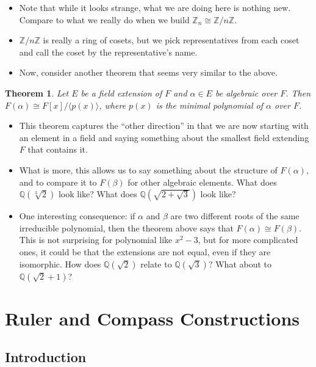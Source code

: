 \documentclass[12pt]{article}
\theoremstyle{plain}
\newtheorem*{theorem}{Theorem}
\theoremstyle{definition}
\theoremstyle{remark}
\newcommand{\ex}{\noindent{\bf Ex: }}
\def\Z{\mathbb Z}
\def\Q{\mathbb Q}
\newcommand{\todayis}[1]{\clearpage{\rhead{\footnotesize #1}}}
\begin{document}
\begin{itemize}
\item Note that while it looks strange, what we are doing here is nothing new.  Compare to what we really do when we build $\Z_n \cong \Z/n\Z$.  
\item $\Z/n\Z$ is really a ring of cosets, but we pick representatives from each coset and call the coset by the representative's name.
\item Now, consider another theorem that seems very similar to the above.
\end{itemize}

\begin{theorem}
  Let $E$ be a field extension of $F$ and $\alpha \in E$ be algebraic over $F$.  Then $F(\alpha) \cong F[x]/\langle p(x) \rangle$, where $p(x)$ is the minimal polynomial of $\alpha$ over $F$.
\end{theorem}

\begin{itemize}
  \item This theorem captures the ``other direction'' in that we are now starting with an element in a field and saying something about the smallest field extending $F$ that contains it. 
  \item What is more, this allows us to say something about the structure of $F(\alpha)$, and to compare it to $F(\beta)$ for other algebraic elements.
  \ex What does $\Q(\sqrt[3]{2})$ look like?
  \ex What does $\Q(\sqrt{2+\sqrt{3}})$ look like?
  \item One interesting consequence: if $\alpha$ and $\beta$ are two different roots of the same irreducible polynomial, then the theorem above says that $F(\alpha) \cong F(\beta)$.  This is not surprising for polynomial like $x^2 - 3$, but for more complicated ones, it could be that the extensions are not equal, even if they are isomorphic.
  \ex How does $\Q(\sqrt{2})$ relate to $\Q(\sqrt{3})$?  What about to $\Q(\sqrt{2}+1)$?
\end{itemize}


\todayis{Wednesday, January 16}


\section*{Ruler and Compass Constructions}

\subsection*{Introduction}
\end{document}
